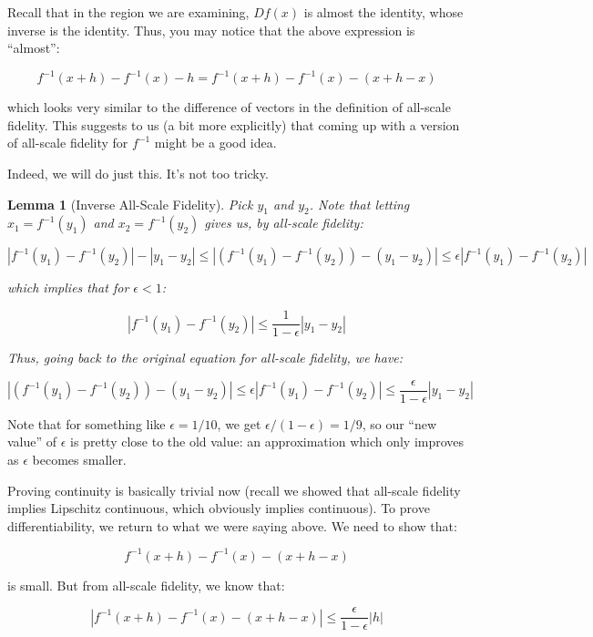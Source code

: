 \documentclass[10pt, oneside]{amsart}
\newtheorem{lem}{Lemma}
\begin{document}
    Recall that in the region we are examining, $Df(x)$ is almost the identity, whose inverse is the identity. Thus, you may notice that the above expression is ``almost'':

    $$f^{-1}(x + h) - f^{-1}(x) - h = f^{-1}(x + h) - f^{-1}(x) - (x + h - x)$$

    which looks very similar to the difference of vectors in the definition of all-scale fidelity. This suggests to us (a bit more explicitly) that coming up with a version of all-scale fidelity
    for $f^{-1}$ might be a good idea.
    \newline

    Indeed, we will do just this. It's not too tricky.

    \begin{lem}[Inverse All-Scale Fidelity]
      Pick $y_1$ and $y_2$. Note that letting $x_1 = f^{-1}(y_1)$ and $x_2 = f^{-1}(y_2)$ gives us, by all-scale fidelity:

      $$|f^{-1}(y_1) - f^{-1}(y_2)| - |y_1 - y_2| \leq | (f^{-1}(y_1) - f^{-1}(y_2)) - (y_1 - y_2)| \leq \epsilon |f^{-1}(y_1) - f^{-1}(y_2)|$$

      which implies that for $\epsilon < 1$:

      $$|f^{-1}(y_1) - f^{-1}(y_2)| \leq \frac{1}{1 - \epsilon} |y_1 - y_2|$$

      Thus, going back to the original equation for all-scale fidelity, we have:

      $$| (f^{-1}(y_1) - f^{-1}(y_2)) - (y_1 - y_2)| \leq \epsilon |f^{-1}(y_1) - f^{-1}(y_2)| \leq \frac{\epsilon}{1 - \epsilon} |y_1 - y_2|$$
    \end{lem}

    Note that for something like $\epsilon = 1/10$, we get $\epsilon / (1 - \epsilon) = 1/9$, so our ``new value'' of $\epsilon$ is pretty close to the old value: an approximation which
    only improves as $\epsilon$ becomes smaller.
    \newline

    Proving continuity is basically trivial now (recall we showed that all-scale fidelity implies Lipschitz continuous, which obviously implies continuous). To prove differentiability, we return to what
    we were saying above. We need to show that:

    $$f^{-1}(x + h) - f^{-1}(x) - (x + h - x)$$

    is small. But from all-scale fidelity, we know that:

    $$|f^{-1}(x + h) - f^{-1}(x) - (x + h - x)| \leq \frac{\epsilon}{1 - \epsilon} |h|$$
\end{document}

